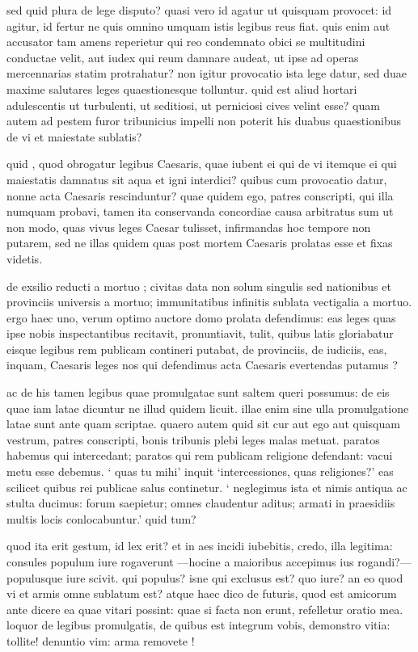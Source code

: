  sed quid plura de lege disputo? quasi vero id agatur ut quisquam provocet: id agitur, id fertur ne quis omnino umquam istis legibus reus fiat. quis enim aut accusator tam amens reperietur qui reo condemnato obici se multitudini conductae velit, aut iudex qui reum damnare audeat, ut ipse ad operas mercennarias statim protrahatur? non igitur provocatio ista lege datur, sed duae maxime salutares leges quaestionesque tolluntur. quid est aliud hortari adulescentis ut turbulenti, ut seditiosi, ut perniciosi cives velint esse? quam autem ad pestem furor tribunicius impelli non poterit his duabus quaestionibus de vi et maiestate sublatis?

 quid , quod obrogatur legibus Caesaris, quae iubent ei qui de vi itemque ei qui maiestatis damnatus sit aqua et igni interdici? quibus cum provocatio datur, nonne acta Caesaris rescinduntur? quae quidem ego, patres conscripti, qui illa numquam probavi, tamen ita conservanda concordiae causa arbitratus sum ut non modo, quas vivus leges Caesar tulisset, infirmandas hoc tempore non putarem, sed ne illas quidem quas post mortem Caesaris prolatas esse et fixas videtis.

 de exsilio reducti a mortuo ; civitas data non solum singulis sed nationibus et provinciis universis a mortuo; immunitatibus infinitis sublata vectigalia a mortuo. ergo haec uno, verum optimo auctore domo prolata defendimus: eas leges quas ipse nobis inspectantibus recitavit, pronuntiavit, tulit, quibus latis gloriabatur eisque legibus rem publicam contineri putabat, de provinciis, de iudiciis, eas, inquam, Caesaris leges nos qui defendimus acta Caesaris evertendas putamus ?

 ac de his tamen legibus quae promulgatae sunt saltem queri possumus: de eis quae iam latae dicuntur ne illud quidem licuit. illae enim sine ulla promulgatione latae sunt ante quam scriptae. quaero autem quid sit cur aut ego aut quisquam vestrum, patres conscripti, bonis tribunis plebi leges malas metuat. paratos habemus qui intercedant; paratos qui rem publicam religione defendant: vacui metu esse debemus. ` quas tu mihi' inquit `intercessiones, quas religiones?' eas scilicet quibus rei publicae salus continetur. ` neglegimus ista et nimis antiqua ac stulta ducimus: forum saepietur; omnes claudentur aditus; armati in praesidiis multis locis conlocabuntur.' quid tum?

 quod ita erit gestum, id lex erit? et in aes incidi iubebitis, credo, illa legitima: consules populum iure rogaverunt —hocine a maioribus accepimus ius rogandi?— populusque iure scivit. qui populus? isne qui exclusus est? quo iure? an eo quod vi et armis omne sublatum est? atque haec dico de futuris, quod est amicorum ante dicere ea quae vitari possint: quae si facta non erunt, refelletur oratio mea. loquor de legibus promulgatis, de quibus est integrum vobis, demonstro vitia: tollite! denuntio vim: arma removete !

